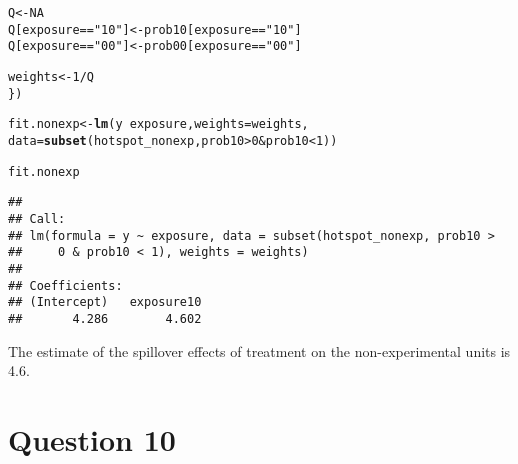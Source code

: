 \documentclass[11pt,notitlepage]{article}\usepackage[]{graphicx}\usepackage[]{color}
\makeatletter
\newcommand{\hlnum}[1]{\textcolor[rgb]{0.686,0.059,0.569}{#1}}%
\newcommand{\hlstr}[1]{\textcolor[rgb]{0.192,0.494,0.8}{#1}}%
\newcommand{\hlopt}[1]{\textcolor[rgb]{0,0,0}{#1}}%
\newcommand{\hlstd}[1]{\textcolor[rgb]{0.345,0.345,0.345}{#1}}%
\newcommand{\hlkwb}[1]{\textcolor[rgb]{0.69,0.353,0.396}{#1}}%
\newcommand{\hlkwc}[1]{\textcolor[rgb]{0.333,0.667,0.333}{#1}}%
\newcommand{\hlkwd}[1]{\textcolor[rgb]{0.737,0.353,0.396}{\textbf{#1}}}%
\newenvironment{kframe}{%
 \def\at@end@of@kframe{}%
 \ifinner\ifhmode%
  \def\at@end@of@kframe{\end{minipage}}%
  \begin{minipage}{\columnwidth}%
 \fi\fi%
 \def\FrameCommand##1{\hskip\@totalleftmargin \hskip-\fboxsep
 \colorbox{shadecolor}{##1}\hskip-\fboxsep
     \hskip-\linewidth \hskip-\@totalleftmargin \hskip\columnwidth}%
 \MakeFramed {\advance\hsize-\width
   \@totalleftmargin\z@ \linewidth\hsize
   \@setminipage}}%
 {\par\unskip\endMakeFramed%
 \at@end@of@kframe}
\newenvironment{knitrout}{}{} %
\makeatother
\begin{document}
\begin{enumerate}[a)]
\begin{knitrout}
\begin{kframe}
\begin{alltt}
  \hlstd{Q} \hlkwb{<-} \hlnum{NA}
  \hlstd{Q[exposure}\hlopt{==}\hlstr{"10"}\hlstd{]} \hlkwb{<-} \hlstd{prob10[exposure}\hlopt{==}\hlstr{"10"}\hlstd{]}
  \hlstd{Q[exposure}\hlopt{==}\hlstr{"00"}\hlstd{]} \hlkwb{<-} \hlstd{prob00[exposure}\hlopt{==}\hlstr{"00"}\hlstd{]}

  \hlstd{weights} \hlkwb{<-} \hlnum{1}\hlopt{/}\hlstd{Q}
  \hlstd{\})}

\hlstd{fit.nonexp} \hlkwb{<-} \hlkwd{lm}\hlstd{(y} \hlopt{~} \hlstd{exposure,} \hlkwc{weights}\hlstd{=weights,}
                 \hlkwc{data}\hlstd{=}\hlkwd{subset}\hlstd{(hotspot_nonexp, prob10} \hlopt{>} \hlnum{0} \hlopt{&} \hlstd{prob10} \hlopt{<} \hlnum{1}\hlstd{))}

\hlstd{fit.nonexp}
\end{alltt}
\begin{verbatim}
## 
## Call:
## lm(formula = y ~ exposure, data = subset(hotspot_nonexp, prob10 > 
##     0 & prob10 < 1), weights = weights)
## 
## Coefficients:
## (Intercept)   exposure10  
##       4.286        4.602
\end{verbatim}
\end{kframe}
\end{knitrout}
 
\end{enumerate}

The estimate of the spillover effects of treatment on the non-experimental units is 4.6.


\section*{Question 10}
\begin{knitrout}
\color{fgcolor}\begin{kframe}
\begin{verbatim}





\end{verbatim}
\end{kframe}
\end{knitrout}
\end{document}
